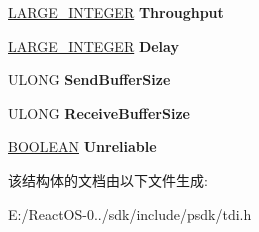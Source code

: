 \begin{DoxyCompactItemize}
\hyperlink{union___l_a_r_g_e___i_n_t_e_g_e_r}{L\+A\+R\+G\+E\+\_\+\+I\+N\+T\+E\+G\+ER} {\bfseries Throughput}
\item 
\mbox{\label{struct___t_d_i___c_o_n_n_e_c_t_i_o_n___i_n_f_o_a1cf0805ad6c3f7ebe36b153cd6f8425a}} 
\hyperlink{union___l_a_r_g_e___i_n_t_e_g_e_r}{L\+A\+R\+G\+E\+\_\+\+I\+N\+T\+E\+G\+ER} {\bfseries Delay}
\item 
\mbox{\label{struct___t_d_i___c_o_n_n_e_c_t_i_o_n___i_n_f_o_a467d242189b91ba98b47aafca859bc72}} 
U\+L\+O\+NG {\bfseries Send\+Buffer\+Size}
\item 
\mbox{\label{struct___t_d_i___c_o_n_n_e_c_t_i_o_n___i_n_f_o_a296c4f70f1a0ab336dafdab646dde361}} 
U\+L\+O\+NG {\bfseries Receive\+Buffer\+Size}
\item 
\mbox{\label{struct___t_d_i___c_o_n_n_e_c_t_i_o_n___i_n_f_o_ab5a88ab6764f9311d34a64a05e8d6afb}} 
\hyperlink{_processor_bind_8h_a112e3146cb38b6ee95e64d85842e380a}{B\+O\+O\+L\+E\+AN} {\bfseries Unreliable}
\end{DoxyCompactItemize}


该结构体的文档由以下文件生成\+:\begin{DoxyCompactItemize}
\item 
E\+:/\+React\+O\+S-\/0../sdk/include/psdk/tdi.\+h\end{DoxyCompactItemize}
